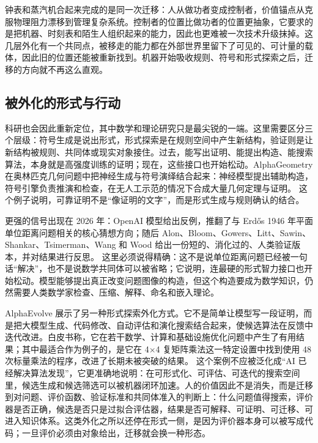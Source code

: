 钟表和蒸汽机合起来完成的是同一次迁移：人从做功者变成控制者，价值锚点从克服物理阻力漂移到管理复杂系统。控制者的位置比做功者的位置更抽象，它要求的是把机器、时刻表和陌生人组织起来的能力，因此也更难被一次技术升级抹掉。这几层外化有一个共同点，被移走的能力都在外部世界里留下了可见的、可计量的载体，因此旧的位置还能被重新找到。机器开始吸收规则、符号和形式探索之后，迁移的方向就不再这么直观。

\subsection{被外化的形式与行动}


科研也会因此重新定位，其中数学和理论研究只是最尖锐的一端。这里需要区分三个层级：符号生成是说出形式，形式探索是在规则空间中产生新结构，验证则是让新结构被规则、共同体或现实对象接住。过去，能写出证明、能提出构造、能搜索算法，本身就是高强度训练的证明；现在，这些接口也开始松动。AlphaGeometry 在奥林匹克几何问题中把神经生成与符号演绎结合起来：神经模型提出辅助构造，符号引擎负责推演和检查，在无人工示范的情况下合成大量几何定理与证明。\cite{trinh2024alphageometry} 这个例子说明，可靠证明不是“像证明的文字”，而是形式生成与规则确认的结合。

更强的信号出现在 2026 年：OpenAI 模型给出反例，推翻了与 Erdős 1946 年平面单位距离问题相关的核心猜想方向；随后 Alon、Bloom、Gowers、Litt、Sawin、Shankar、Tsimerman、Wang 和 Wood 给出一份短的、消化过的、人类验证版本，并对结果进行反思。\cite{openai2026unitdistancedisproof,alon2026remarks} 这里必须说得精确：这不是说单位距离问题已经被一句话“解决”，也不是说数学共同体可以被省略；它说明，连最硬的形式智力接口也开始松动。模型能够提出真正改变问题图像的构造，但这个构造要成为数学知识，仍然需要人类数学家检查、压缩、解释、命名和嵌入理论。

AlphaEvolve 展示了另一种形式探索外化方式。它不是简单让模型写一段证明，而是把大模型生成、代码修改、自动评估和演化搜索结合起来，使候选算法在反馈中迭代改进。白皮书称，它在若干数学、计算和基础设施优化问题中产生了有用结果；其中最适合作为例子的，是它在 4$\times$4 复矩阵乘法这一特定设置中找到使用 48 次标量乘法的程序，改进了长期未被突破的结果。\cite{novikov2025alphaevolve} 这个案例不应被泛化成“AI 已经解决算法发现”，它更准确地说明：在可形式化、可评估、可迭代的搜索空间里，候选生成和候选筛选可以被机器闭环加速。人的价值因此不是消失，而是迁移到对问题、评价函数、验证标准和共同体准入的判断上：什么问题值得搜索，评价器是否正确，候选是否只是过拟合评估器，结果是否可解释、可证明、可迁移、可进入知识体系。这类外化之所以还停在形式一侧，是因为评价器本身可以被写成代码；一旦评价必须由对象给出，迁移就会换一种形态。

